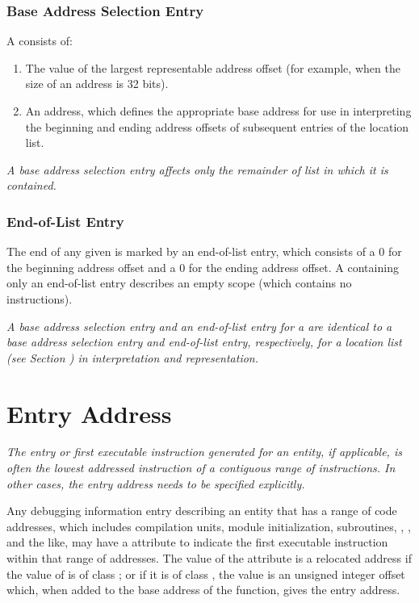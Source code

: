 \subsubsection{Base Address Selection Entry}
A  consists of:
\begin{enumerate}[1. ]
\item The value of the largest representable address offset 
(for example, \wffffffff when the size of an address is 32 bits).

\item An address, which defines the appropriate base address 
for use in interpreting the beginning and ending address offsets 
of subsequent entries of the location list.
\end{enumerate}

\textit{A base address selection entry affects only the 
remainder of list in which it is contained.}

\subsubsection{End-of-List Entry}
The end of any given  is marked by an 
end-of-list entry, 
which consists of a 0 for the beginning address
offset and a 0 for the ending address offset. 
A 
containing only an end-of-list entry describes an empty scope
(which contains no instructions).

\textit{A base address selection entry and an 
end-of-list entry for
a  
are identical to a base address selection entry
and end-of-list entry, respectively, for a location list
(see Section ) 
in interpretation and representation.}


\section{Entry Address}
\label{chap:entryaddress}
\textit{The entry or first executable instruction generated
for an entity, if applicable, is often the lowest addressed
instruction of a contiguous range of instructions. In other
cases, the entry address needs to be specified explicitly.}

Any debugging information entry describing an entity that has
a range of code addresses, which includes compilation units,
module initialization, subroutines, 
,
,
and the like, may have a \DWATentrypcNAME{} attribute 
to indicate the first executable instruction within that 
range\hypertarget{chap:entryaddressofscope}{}
of addresses. The value of the \DWATentrypcNAME{} attribute is a
relocated address if the
value of \DWATentrypcNAME{} is of class \CLASSaddress; or if it is of class
\CLASSconstant, the value is an unsigned integer offset which, when
added to the base address of the function, gives the entry
address. 

